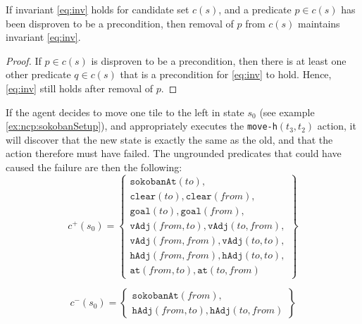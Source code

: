 \documentclass[../../Master.tex]{subfiles}
\begin{document}
\begin{theorem} \label{th:invHolds}
    If invariant \eqref{eq:inv} holds for candidate set $c(s)$, and a predicate $p \in c(s)$ has been disproven to be a precondition, then removal of $p$ from $c(s)$ maintains invariant \eqref{eq:inv}.
\end{theorem}

\begin{proof}
    If $p \in c(s)$ is disproven to be a precondition, then there is at least one other predicate $q \in c(s)$ that is a precondition for \eqref{eq:inv} to hold. Hence, \eqref{eq:inv} still holds after removal of $p$.
\end{proof}

\begin{example}
    If the agent decides to move one tile to the left in state $s_0$ (see example \ref{ex:ncp:sokobanSetup}), and appropriately executes the \texttt{move-h}$(t_3, t_2)$ action, it will discover that the new state is exactly the same as the old, and that the action therefore must have failed. The ungrounded predicates that could have caused the failure are then the following:
    \begin{equation*}
        c^+(s_0) = \left\{
            \begin{gathered}
                \texttt{sokobanAt}(to), \\
                \texttt{clear}(to), \texttt{clear}(from), \\
                \texttt{goal}(to), \texttt{goal}(from), \\
                \texttt{vAdj}(from, to), \texttt{vAdj}(to, from), \\
                \texttt{vAdj}(from, from), \texttt{vAdj}(to, to), \\
                \texttt{hAdj}(from, from), \texttt{hAdj}(to, to), \\
                \texttt{at}(from, to), \texttt{at}(to, from)
            \end{gathered}
        \right\}
    \end{equation*}

    \begin{equation*}
        c^-(s_0) = \left\{
            \begin{gathered}
                \texttt{sokobanAt}(from), \\
                \texttt{hAdj}(from, to), \texttt{hAdj}(to, from)
            \end{gathered}
        \right\}
    \end{equation*}


\end{example}
\end{document}
